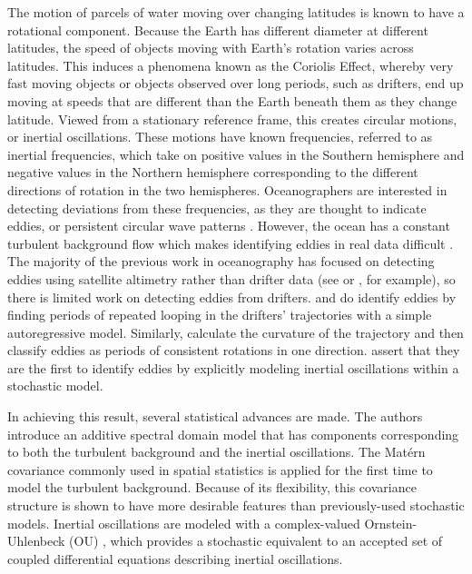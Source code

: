 \documentclass{stat572Style}
\begin{document}
\par
The motion of parcels of water moving over changing latitudes is known to have a rotational component. 
Because the Earth has  different diameter at different latitudes, the speed of objects moving with Earth's rotation varies across latitudes.  
This induces a phenomena known as the Coriolis Effect, whereby very fast moving objects or objects observed over long periods, such as drifters, end up moving at speeds that are different than the Earth beneath them as they change latitude. 
Viewed from a stationary reference frame, this creates circular motions, or inertial oscillations. 
These motions have known frequencies, referred to as inertial frequencies, which take on positive values in the Southern hemisphere and negative values in the Northern hemisphere corresponding to the different directions of rotation in the two hemispheres.
 Oceanographers  are interested in detecting deviations from these frequencies, as they are thought to indicate eddies, or persistent circular wave patterns \citep{Kunze1985}.
  However, the ocean has a constant turbulent background flow which makes identifying eddies in real data difficult \citep{ Elipot2010}.
 The majority of the previous work in oceanography has focused on detecting eddies using satellite altimetry rather than drifter data (see \citet{Isern2003} or \citet{Fu2010}, for example), so there is limited work on detecting eddies from drifters.
\citet{Shoosmith2005} and \citet{Lankhorst2006} do identify eddies by finding periods of repeated looping in the drifters' trajectories with a simple autoregressive model.
 Similarly, \citet{Boebel2003} calculate the curvature of the trajectory  and then classify eddies as periods of consistent rotations in one direction. 
 \citet{Sykulski2016} assert that they are the first to identify eddies by explicitly modeling inertial oscillations within a stochastic model.  
 \par
In achieving this result, several statistical advances are made.  
The authors introduce an additive spectral domain model that has components corresponding to both the turbulent background and the inertial oscillations. 
The Mat\'{e}rn covariance commonly used in spatial statistics \citep{Gneiting2012} is applied for the first time to model the turbulent background. 
Because of its flexibility, this covariance structure is shown to have more desirable features than previously-used stochastic models. 
Inertial oscillations are modeled with a complex-valued Ornstein-Uhlenbeck (OU) \citep{Arato1962, Jeffreys1968}, which provides a stochastic equivalent to an accepted set of coupled differential equations describing inertial oscillations. 
\end{document}
